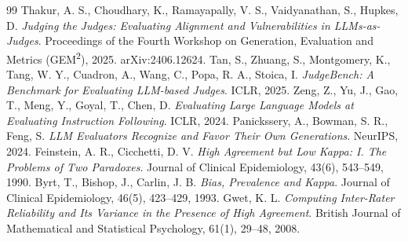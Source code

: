 \documentclass{IOS-Book-Article}
\begin{document}
\begin{thebibliography}{99}
 Thakur, A. S., Choudhary, K., Ramayapally, V. S., Vaidyanathan, S., Hupkes, D. \emph{Judging the Judges: Evaluating Alignment and Vulnerabilities in LLMs-as-Judges}. Proceedings of the Fourth Workshop on Generation, Evaluation and Metrics (GEM\textsuperscript{2}), 2025. arXiv:2406.12624.
 Tan, S., Zhuang, S., Montgomery, K., Tang, W. Y., Cuadron, A., Wang, C., Popa, R. A., Stoica, I. \emph{JudgeBench: A Benchmark for Evaluating LLM-based Judges}. ICLR, 2025.
 Zeng, Z., Yu, J., Gao, T., Meng, Y., Goyal, T., Chen, D. \emph{Evaluating Large Language Models at Evaluating Instruction Following}. ICLR, 2024.
 Panickssery, A., Bowman, S. R., Feng, S. \emph{LLM Evaluators Recognize and Favor Their Own Generations}. NeurIPS, 2024.
 Feinstein, A. R., Cicchetti, D. V. \emph{High Agreement but Low Kappa: I. The Problems of Two Paradoxes}. Journal of Clinical Epidemiology, 43(6), 543--549, 1990.
 Byrt, T., Bishop, J., Carlin, J. B. \emph{Bias, Prevalence and Kappa}. Journal of Clinical Epidemiology, 46(5), 423--429, 1993.
 Gwet, K. L. \emph{Computing Inter-Rater Reliability and Its Variance in the Presence of High Agreement}. British Journal of Mathematical and Statistical Psychology, 61(1), 29--48, 2008.
\end{thebibliography}
\end{document}

